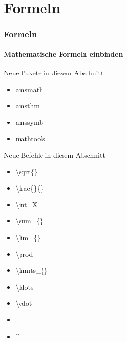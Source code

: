 \section{Formeln}
\begin{frame}
\frametitle{Formeln}
\framesubtitle{Mathematische Formeln einbinden}

\begin{exampleblock}{Neue Pakete in diesem Abschnitt}
\begin{multicols}{2}
\begin{itemize}
\item amsmath 
\item amsthm
\item amssymb
\item mathtools
\end{itemize}
\end{multicols}
\end{exampleblock}

\begin{block}{Neue Befehle in diesem Abschnitt}
\begin{multicols}{2}
\begin{itemize}
\item \color{nounibaredI}\textbackslash sqrt\color{black}\{\}
\item \color{nounibaredI}\textbackslash frac\color{black}\{\}\{\}
\item \color{nounibaredI}\textbackslash int\color{black}\_X
\item \color{nounibaredI}\textbackslash sum\color{black}\_\{\}
\item \color{nounibaredI}\textbackslash lim\color{black}\_\{\}
\item \color{nounibaredI}\textbackslash prod\color{black}
\item \color{nounibaredI}\textbackslash limits\color{black}\_\{\}
\item \color{nounibaredI}\textbackslash ldots\color{black}
\item \color{nounibaredI}\textbackslash cdot\color{black}
\item \color{nounibaredI}\_\color{black}
\item \color{nounibaredI}\^~\color{black}
\end{itemize}
\end{multicols}
\end{block}

\end{frame}


